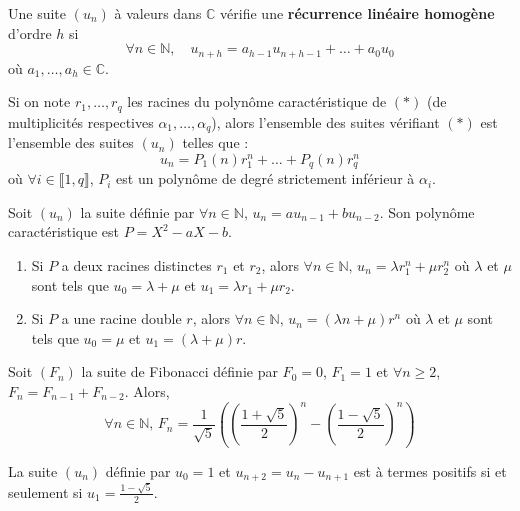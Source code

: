   \begin{definition}
    Une suite $(u_n)$ à valeurs dans $\mathbb{C}$ vérifie une \textbf{récurrence linéaire homogène} d'ordre $h$ si
    \[ \forall n \in \mathbb{N}, \quad u_{n+h} = a_{h-1} u_{n+h-1} + \dots + a_0 u_0 \tag{$*$} \]
    où $a_1, \dots, a_h \in \mathbb{C}$.
  \end{definition}

  \begin{proposition}
    Si on note $r_1, \dots, r_q$ les racines du polynôme caractéristique de $(*)$ (de multiplicités respectives $\alpha_1, \dots, \alpha_q$), alors l'ensemble des suites vérifiant $(*)$ est l'ensemble des suites $(u_n)$ telles que :
    \[ u_n = P_1(n) r_1^n + \dots + P_q(n) r_q^n \]
    où $\forall i \in \llbracket 1, q \rrbracket$, $P_i$ est un polynôme de degré strictement inférieur à $\alpha_i$.
  \end{proposition}

  \begin{example}
    Soit $(u_n)$ la suite définie par $\forall n \in \mathbb{N}, \, u_n = a u_{n-1} + b u_{n-2}$. Son polynôme caractéristique est $P = X^2 - aX - b$.
    \begin{enumerate}
      \item Si $P$ a deux racines distinctes $r_1$ et $r_2$, alors $\forall n \in \mathbb{N}, \, u_n = \lambda r_1^n + \mu r_2^n$ où $\lambda$ et $\mu$ sont tels que $u_0 = \lambda + \mu$ et $u_1 = \lambda r_1 + \mu r_2$.
      \item Si $P$ a une racine double $r$, alors $\forall n \in \mathbb{N}, \, u_n = (\lambda n + \mu) r^n$ où $\lambda$ et $\mu$ sont tels que $u_0 = \mu$ et $u_1 = (\lambda + \mu) r$.
    \end{enumerate}
  \end{example}


  \begin{example}
    Soit $(F_n)$ la suite de Fibonacci définie par $F_0 = 0$, $F_1 = 1$ et $\forall n \geq 2$, $F_n = F_{n-1} + F_{n-2}$. Alors,
    \[ \forall n \in \mathbb{N}, \, F_n = \frac{1}{\sqrt{5}} \left ( \left ( \frac{1 + \sqrt{5}}{2} \right)^n - \left ( \frac{1 - \sqrt{5}}{2} \right)^n \right) \]
  \end{example}

  \begin{example}
    La suite $(u_n)$ définie par $u_0 = 1$ et $u_{n+2} = u_n - u_{n+1}$ est à termes positifs si et seulement si $u_1 = \frac{1 - \sqrt{5}}{2}$.
  \end{example}

